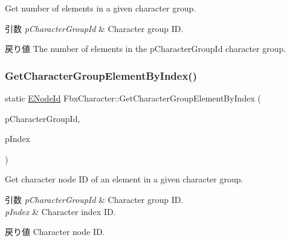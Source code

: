 Get number of elements in a given character group. 
\begin{DoxyParams}{引数}
{\em p\+Character\+Group\+Id} & Character group ID. \\
\hline
\end{DoxyParams}
\begin{DoxyReturn}{戻り値}
The number of elements in the p\+Character\+Group\+Id character group. 
\end{DoxyReturn}
\mbox{\label{class_fbx_character_a8bd837899b9c7cb0579c30486bd3f063}} 
\subsubsection{\texorpdfstring{Get\+Character\+Group\+Element\+By\+Index()}{GetCharacterGroupElementByIndex()}}
{\footnotesize\ttfamily static \hyperlink{class_fbx_character_ad75bf42026e435ac0ff4d7ece2317be4}{E\+Node\+Id} Fbx\+Character\+::\+Get\+Character\+Group\+Element\+By\+Index (\begin{DoxyParamCaption}\item[{\hyperlink{class_fbx_character_aa04f2d3cc99d77fe7b9d2066fc9f255e}{E\+Group\+Id}}]{p\+Character\+Group\+Id,  }\item[{int}]{p\+Index }\end{DoxyParamCaption})\hspace{0.3cm}{\ttfamily [static]}}

Get character node ID of an element in a given character group. 
\begin{DoxyParams}{引数}
{\em p\+Character\+Group\+Id} & Character group ID. \\
\hline
{\em p\+Index} & Character index ID. \\
\hline
\end{DoxyParams}
\begin{DoxyReturn}{戻り値}
Character node ID. 
\end{DoxyReturn}
\mbox{\label{class_fbx_character_a0f42325e394e7ec5184a7c396d4b1b4a}} 
